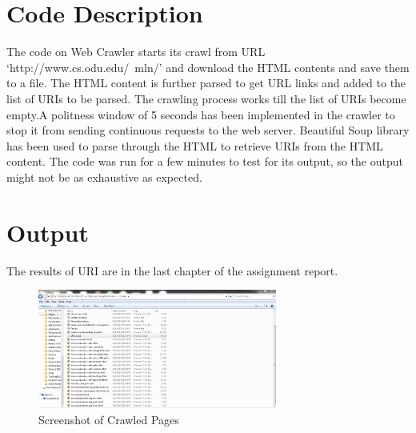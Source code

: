 \documentclass[12pt]{report}
\begin{document}
\section{Code Description}
The code on Web Crawler starts its crawl from URL `http://www.cs.odu.edu/~mln/' and download the HTML contents and save them to a file. The HTML content is further parsed to get URL links and added to the list of URIs to be parsed. The crawling process works till the list of URIs become empty.A politness window of 5 seconds has been implemented in the crawler to stop it from sending continuous requests to the web server. Beautiful Soup library has been used to parse through the HTML to retrieve URIs from the HTML content.  \cite{11} The code was run for a few minutes to test for its output, so the output might not be as exhaustive as expected.  
\section{Output}
The results of URI are in the last chapter of the assignment report.
\begin{figure}[ht]

  \centering
  \includegraphics[width=0.7\textwidth,]{Crawl.PNG}
  \caption{Screenshot of Crawled Pages}
  \label{fig:11}
\end{figure}
\end{document}
